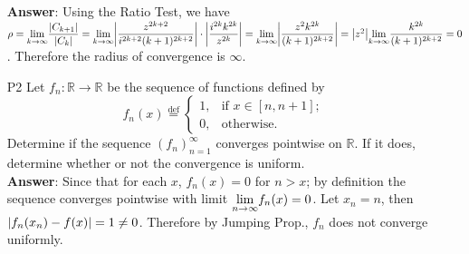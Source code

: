 \documentclass{article}
\begin{document}
\begin{itemize}
            \textbf{Answer}: Using the Ratio Test, we have $\rho=\mathlarger{\lim_{k\rightarrow\infty}}\dfrac{\abs{C_{k+1}}}{\abs{C_k}}=\mathlarger{\lim_{k\rightarrow\infty}}\abs{\dfrac{z^{2k+2}}{i^{2k+2}(k+1)^{2k+2}}}\cdot\abs{\dfrac{i^{2k}k^{2k}}{z^{2k}}}=\mathlarger{\lim_{k\rightarrow\infty}}\abs{\dfrac{z^2k^{2k}}{(k+1)^{2k+2}}}=\abs{z^2}\mathlarger{\lim_{k\rightarrow\infty}}\dfrac{k^{2k}}{(k+1)^{2k+2}}=0$. Therefore the radius of convergence is $\infty$.
      \item [P2] Let $f_n:\mathbb{R}\rightarrow\mathbb{R}$ be the sequence of functions defined by \[f_n(x)\stackrel{\text{def}}{=}\begin{cases}
                        1, & \text{if }x\in[n,n+1]; \\
                        0, & \text{otherwise}.
                  \end{cases}\] Determine if the sequence $(f_n)_{n=1}^\infty$ converges pointwise on $\mathbb{R}$. If it does, determine whether or not the convergence is uniform.\\
            \textbf{Answer}: Since that for each $x$, $f_n(x)=0$ for $n>x$; by definition the sequence converges pointwise with limit $\mathlarger{\lim_{n\rightarrow\infty}}f_n(x)=0$. Let $x_n=n$, then $\abs{f_n(x_n)-f(x)}=1\neq 0$. Therefore by Jumping Prop., $f_n$ does not converge uniformly.
\end{itemize}
\end{document}
